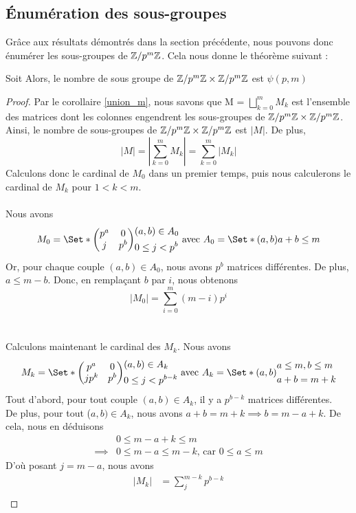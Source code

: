 \documentclass[12pt]{article}
\newcommand{\ZpmZ}{\Z/p^m\Z}
\newcommand{\ZZpm}{\ZpmZ \x \ZpmZ}
\newcommand{\Mz}{\Set*{
	\begin{pmatrix}
		p^a  & 0   \\
		j & p^b
	\end{pmatrix}
}{
	\begin{aligned}
		 & (a, b) \in A_0      \\
		 & 0 \le j < p^{b}
	\end{aligned}
}}
\newcommand{\Mk}{\Set*{
	\begin{pmatrix}
		p^a  & 0   \\
		jp^k & p^b
	\end{pmatrix}
}{
	\begin{aligned}
		 & (a, b) \in A_k      \\
		 & 0 \le j < p^{b - k}
	\end{aligned}
}}
\newcommand{\Az}{\Set*{(a,b)}{ a + b \le m}}
\newcommand{\Ak}{\Set*{
	(a,b)}{
	\begin{aligned}
		 & a \le m, b \le m \\
		 & a + b = m + k
	\end{aligned}
}}
\begin{document}
\subsection{Énumération des sous-groupes}
Grâce aux résultats démontrés dans la section précédente, nous pouvons donc énumérer
les sous-groupes de $\ZpmZ$. Cela nous donne le théorème suivant :
\begin{theorem}
	Soit
	Alors, le nombre de sous groupe de $\ZZpm$ est $\psi(p,m)$
\end{theorem}

\begin{proof}
	Par le corollaire \ref{union_m}, nous savons que M = $\bigsqcup\limits_{k = 0}^{m} M_k$
	est l'ensemble des matrices dont les colonnes engendrent les sous-groupes de $\ZZpm$.
	Ainsi, le nombre de sous-groupes de $\ZZpm$ est $|M|$.
	De plus,
	$$|M| = |\sum_{k=0}^{m} M_k| = \sum_{k=0}^{m}|M_k|$$
	\noindent
	Calculons donc le cardinal de $M_0$ dans un premier temps, puis nous calculerons
	le cardinal de $M_k$ pour $1 < k < m$.\\\vspace*{1cm}\\
	Nous avons $$M_0 =\Mz \text{ avec } A_0 = \Az$$
	Or, pour chaque couple $(a,b) \in A_0$, nous avons $p^b$ matrices différentes.
	De plus, $a \le m - b$. Donc, en remplaçant $b$ par $i$, nous obtenons
	$$ |M_0| = \sum_{i=0}^{m}(m-i)p^i$$
	\\\vspace*{1cm}\\
	Calculons maintenant le cardinal des $M_k$. Nous avons
	$$M_k = \Mk \text{ avec } A_k = \Ak$$
	Tout d'abord, pour tout couple $(a,b) \in A_k$, il y a $p^{ b-k}$ matrices différentes.\\
	De plus, pour tout ($a,b) \in A_k$, nous avons
	$a + b = m + k \implies b = m - a +k$. De cela, nous en déduisons
	\begin{equation*}
		\begin{aligned}
			         & 0 \le m - a + k \le m                             \\
			\implies & 0\le m - a \le m - k \text{, car  } 0 \le a \le m
		\end{aligned}
	\end{equation*}
	D'où posant $j = m - a$, nous avons
	\begin{equation*}
		\begin{split}
			|M_k| &= \sum_{j}^{m - k}p^{b-k}\\

\end{split}
\end{equation*}
\end{proof}
\end{document}
